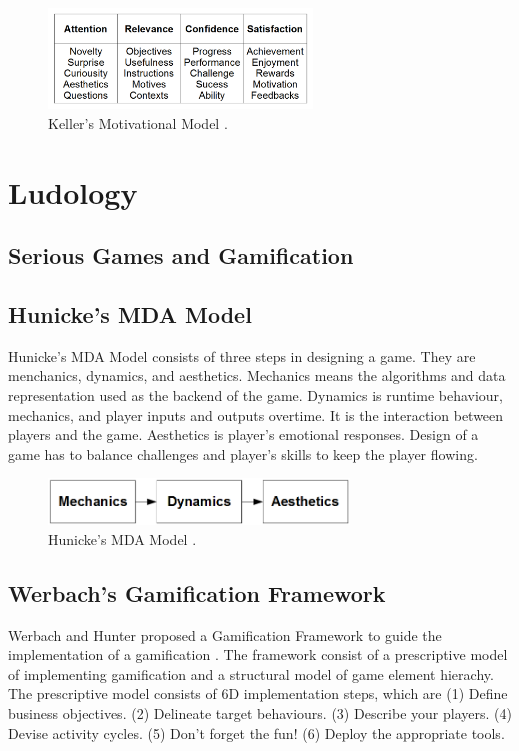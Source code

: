 \documentclass[12pt, a4paper]{report}
\begin{document}
\begin{figure}[ht]
\centering
\includegraphics[width=7cm]{keller}
\caption{Keller's Motivational Model \cite{keller2010motivational}.}
\label{fig:keller}
\end{figure}

\section{Ludology}

\subsection{Serious Games and Gamification}


\subsection{Hunicke's MDA Model}
Hunicke's MDA Model \cite{hunicke2004mda} consists of three steps in designing a game. They are menchanics, dynamics, and aesthetics. Mechanics means the algorithms and data representation used as the backend of the game. Dynamics is runtime behaviour, mechanics, and player inputs and outputs overtime. It is the interaction between players and the game. Aesthetics is player's emotional responses. Design of a  game has to balance challenges and player's skills to keep the player flowing.

\begin{figure}[ht]
\centering
\includegraphics[width=8cm]{mda}
\caption{Hunicke's MDA Model \cite{hunicke2004mda}.}
\label{fig:mda}
\end{figure}

\subsection{Werbach's Gamification Framework}
Werbach and Hunter proposed a Gamification Framework to guide the implementation of a gamification \cite{werbach2012win}. The framework consist of  a prescriptive model of implementing gamification and a structural model of game element hierachy. The prescriptive model consists of 6D implementation steps, which are (1) Define  business objectives. (2) Delineate target behaviours. (3) Describe your players. (4) Devise activity cycles. (5) Don't forget the fun! (6) Deploy the appropriate tools.
\end{document}

